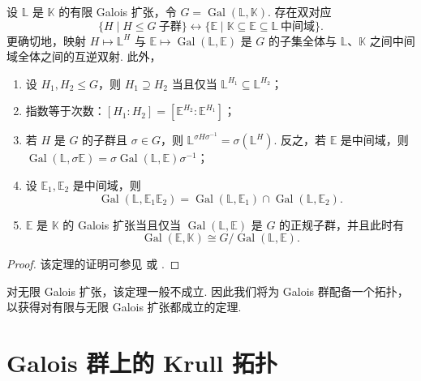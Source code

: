 \begin{theorem}\label{c2-thm-1-5}
设 $\mathbb{L}$ 是 $\mathbb{K}$ 的有限 Galois 扩张，令 $G=\operatorname{Gal}(\mathbb{L},\mathbb{K})$. 存在双对应
\[
\{H\mid H\leq G\ \text{子群}\}\leftrightarrow\{\mathbb{E}\mid \mathbb{K}\subseteq\mathbb{E}\subseteq\mathbb{L}\ \text{中间域}\}.
\]
更确切地，映射 $H\mapsto\mathbb{L}^{H}$ 与 $\mathbb{E}\mapsto\operatorname{Gal}(\mathbb{L},\mathbb{E})$ 是 $G$ 的子集全体与 $\mathbb{L}$、$\mathbb{K}$ 之间中间域全体之间的互逆双射. 此外，
\begin{enumerate}
    \item 设 $H_{1},H_{2}\leq G$，则 $H_{1}\supseteq H_{2}$ 当且仅当 $\mathbb{L}^{H_{1}}\subseteq\mathbb{L}^{H_{2}}$；
    \item 指数等于次数：$[H_{1}:H_{2}]=[\mathbb{E}^{H_{2}}:\mathbb{E}^{H_{1}}]$；
    \item 若 $H$ 是 $G$ 的子群且 $\sigma\in G$，则 $\mathbb{L}^{\sigma H\sigma^{-1}}=\sigma(\mathbb{L}^{H})$. 反之，若 $\mathbb{E}$ 是中间域，则 $\operatorname{Gal}(\mathbb{L},\sigma\mathbb{E})=\sigma\operatorname{Gal}(\mathbb{L},\mathbb{E})\sigma^{-1}$；
    \item 设 $\mathbb{E}_{1},\mathbb{E}_{2}$ 是中间域，则
    \[
    \operatorname{Gal}(\mathbb{L},\mathbb{E}_{1}\mathbb{E}_{2})=\operatorname{Gal}(\mathbb{L},\mathbb{E}_{1})\cap\operatorname{Gal}(\mathbb{L},\mathbb{E}_{2}).
    \]
    \item $\mathbb{E}$ 是 $\mathbb{K}$ 的 Galois 扩张当且仅当 $\operatorname{Gal}(\mathbb{L},\mathbb{E})$ 是 $G$ 的正规子群，并且此时有
    \[
    \operatorname{Gal}(\mathbb{E},\mathbb{K})\cong G/\operatorname{Gal}(\mathbb{L},\mathbb{E}).
    \]
\end{enumerate}
\end{theorem}

\begin{proof}
该定理的证明可参见 \cite[Chapter~3]{mil08} 或 \cite[\S1, Chapter~IV]{lang02a}.
\end{proof}

\begin{remark}\label{c2-rem-1-21}
对无限 Galois 扩张，该定理一般不成立. 因此我们将为 Galois 群配备一个拓扑，以获得对有限与无限 Galois 扩张都成立的定理.
\end{remark}

\section{Galois 群上的 Krull 拓扑}

